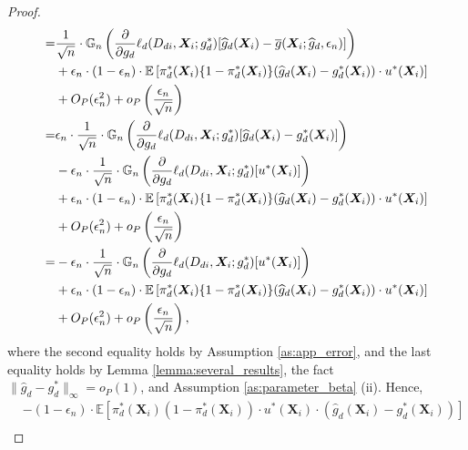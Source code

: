 \documentclass[11pt]{article}
\numberwithin{equation}{section}
\begin{document}
\begin{proof}
\begin{align}
		=& \frac{1}{\sqrt{n}}\cdot  \mathbb{G}_n\left(\frac{\partial}{\partial g_d}\ell_d(D_{di},\boldsymbol{X}_{i};g^*_d)[ \widehat{g}_d(\boldsymbol{X}_{i})-\overline{g}(\boldsymbol{X}_{i};\widehat{g}_d,\epsilon_n)]\right) \notag\\
		&+\epsilon_n \cdot (1-\epsilon_n)\cdot   \mathbb{E}\left[\pi_d^*(\boldsymbol{X}_i)\{1-\pi_d^*(\boldsymbol{X}_i)\}(\widehat{g}_d(\boldsymbol{X}_{i})-g^*_d(\boldsymbol{X}_{i})) \cdot u^*(\boldsymbol{X}_{i})\right] \notag\\
		&+O_P(\epsilon_n^2)+o_P\left(\frac{\epsilon_n}{\sqrt{n}}\right) \notag \\
		=&\epsilon_n\cdot\frac{1}{\sqrt{n}}\cdot  \mathbb{G}_n\left(\frac{\partial}{\partial g_d}\ell_d(D_{di},\boldsymbol{X}_{i};g^*_d)[ \widehat{g}_d(\boldsymbol{X}_{i})-g_d^*(\boldsymbol{X}_i)]\right) \notag\\
		&-\epsilon_n\cdot\frac{1}{\sqrt{n}}\cdot  \mathbb{G}_n\left(\frac{\partial}{\partial g_d}\ell_d(D_{di},\boldsymbol{X}_{i};g^*_d)[u^*(\boldsymbol{X}_i)]\right) \notag\\
		&+\epsilon_n \cdot (1-\epsilon_n)\cdot   \mathbb{E}\left[\pi_d^*(\boldsymbol{X}_i)\{1-\pi_d^*(\boldsymbol{X}_i)\}(\widehat{g}_d(\boldsymbol{X}_{i})-g^*_d(\boldsymbol{X}_{i})) \cdot u^*(\boldsymbol{X}_{i})\right] \notag\\
		&+O_P(\epsilon_n^2)+o_P\left(\frac{\epsilon_n}{\sqrt{n}}\right)  \notag\\
		=&-\epsilon_n\cdot\frac{1}{\sqrt{n}}\cdot  \mathbb{G}_n\left(\frac{\partial}{\partial g_d}\ell_d(D_{di},\boldsymbol{X}_{i};g^*_d)[u^*(\boldsymbol{X}_i)]\right) \notag\\
		&+\epsilon_n \cdot (1-\epsilon_n)\cdot   \mathbb{E}\left[\pi_d^*(\boldsymbol{X}_i)\{1-\pi_d^*(\boldsymbol{X}_i)\}(\widehat{g}_d(\boldsymbol{X}_{i})-g^*_d(\boldsymbol{X}_{i})) \cdot u^*(\boldsymbol{X}_{i})\right] \notag\\
		&+O_P(\epsilon_n^2)+o_P\left(\frac{\epsilon_n}{\sqrt{n}}\right),  \notag
	\end{align}
	where the second equality holds by Assumption \ref{as:app_error}, and the last equality holds by Lemma \ref{lemma:several_results}, the fact $\|\widehat{g}_d-g_d^*\|_{\infty}=o_P(1)$, and Assumption \ref{as:parameter_beta} (ii). Hence,
	\begin{align*}
		&- (1-\epsilon_n) \cdot \mathbb{E}\left[  \pi^*_d(\boldsymbol{X}_{i})(1-\pi^*_d(\boldsymbol{X}_{i}))\cdot u^*(\boldsymbol{X}_{i}) \cdot (\widehat{g}_d(\boldsymbol{X}_{i})-g^*_d(\boldsymbol{X}_{i}))\right]\\

\end{align*}
\end{proof}
\end{document}
